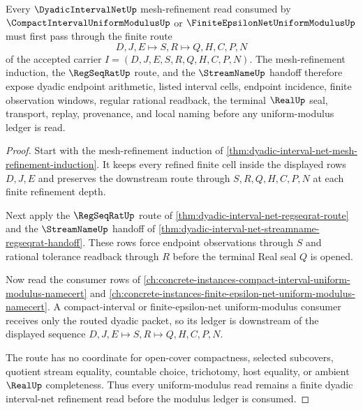 \begin{theorem}
\label{thm:dyadic-interval-net-uniform-modulus-refinement-route}
Every $\DyadicIntervalNetUp$ mesh-refinement read consumed by $\CompactIntervalUniformModulusUp$ or $\FiniteEpsilonNetUniformModulusUp$ must first pass through the finite route
$$
D,J,E \longmapsto S,R \longmapsto Q,H,C,P,N
$$
of the accepted carrier $I=(D,J,E,S,R,Q,H,C,P,N)$. The mesh-refinement induction, the $\RegSeqRatUp$ route, and the $\StreamNameUp$ handoff therefore expose dyadic endpoint arithmetic, listed interval cells, endpoint incidence, finite observation windows, regular rational readback, the terminal $\RealUp$ seal, transport, replay, provenance, and local naming before any uniform-modulus ledger is read.
\end{theorem}
\begin{proof}
Start with the mesh-refinement induction of \autoref{thm:dyadic-interval-net-mesh-refinement-induction}. It keeps every refined finite cell inside the displayed rows $D,J,E$ and preserves the downstream route through $S,R,Q,H,C,P,N$ at each finite refinement depth.

Next apply the $\RegSeqRatUp$ route of \autoref{thm:dyadic-interval-net-regseqrat-route} and the $\StreamNameUp$ handoff of \autoref{thm:dyadic-interval-net-streamname-regseqrat-handoff}. These rows force endpoint observations through $S$ and rational tolerance readback through $R$ before the terminal Real seal $Q$ is opened.

Now read the consumer rows of \autoref{ch:concrete-instances-compact-interval-uniform-modulus-namecert} and \autoref{ch:concrete-instances-finite-epsilon-net-uniform-modulus-namecert}. A compact-interval or finite-epsilon-net uniform-modulus consumer receives only the routed dyadic packet, so its ledger is downstream of the displayed sequence $D,J,E \longmapsto S,R \longmapsto Q,H,C,P,N$.

The route has no coordinate for open-cover compactness, selected subcovers, quotient stream equality, countable choice, trichotomy, host equality, or ambient $\RealUp$ completeness. Thus every uniform-modulus read remains a finite dyadic interval-net refinement read before the modulus ledger is consumed.
\end{proof}
